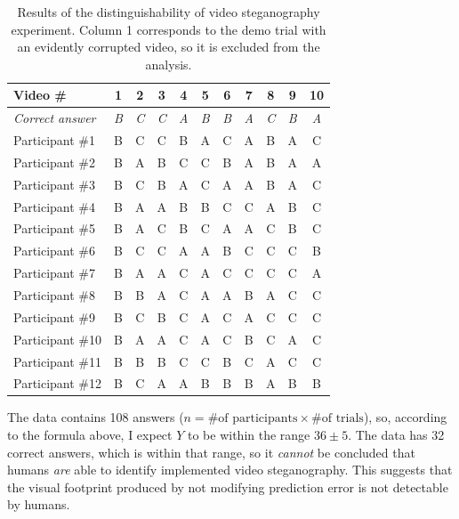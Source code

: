\documentclass[12pt,british,twoside,notitlepage,usenames,dvipsnames,hypens,final]{report}
\numberwithin{equation}{section}
\numberwithin{figure}{section}
\begin{document}
\begin{table}[tbh]
\centering
\bgroup
\def\arraystretch{1.3}
\begin{tabular}{|l|c|c|c|c|c|c|c|c|c|c|}
\hline
\textbf{Video \#} & \textbf{1} & \textbf{2} & \textbf{3} & \textbf{4} & \textbf{5} & \textbf{6} & \textbf{7} & \textbf{8} & \textbf{9} & \textbf{10}\\
\hline
\textit{Correct answer} & \textit{B} & \textit{C} & \textit{C} & \textit{A} & \textit{B} & \textit{B} & \textit{A} & \textit{C} & \textit{B} & \textit{A}\\
\hline
Participant \#1  & B & C & C & B & A & C & A & B & A & C \\
Participant \#2  & B & A & B & C & C & B & A & B & A & A \\
Participant \#3  & B & C & B & A & C & A & A & B & A & C \\
Participant \#4  & B & A & A & B & B & C & C & A & B & C \\
Participant \#5  & B & A & C & B & C & A & A & C & B & C \\
Participant \#6  & B & C & C & A & A & B & C & C & C & B \\
Participant \#7  & B & A & A & C & A & C & C & C & C & A \\
Participant \#8  & B & B & A & C & A & A & B & A & C & C \\
Participant \#9  & B & C & B & C & A & C & A & C & C & C \\
Participant \#10 & B & A & A & C & A & C & B & C & A & C \\
Participant \#11 & B & B & B & C & C & B & C & A & C & C \\
Participant \#12 & B & C & A & A & B & B & B & A & B & B \\
\hline
\end{tabular}
\egroup
\caption{Results of the distinguishability of video steganography experiment. Column 1 corresponds to the demo trial with an evidently corrupted video, so it is excluded from the analysis.}
\label{tbl:detect-exp-res}
\end{table}

The data contains 108 answers ($n = \text{\# of participants} \times \text{\# of trials}$), so, according to the formula above, I expect $Y$ to be within the range $36 \pm 5$. The data has 32 correct answers, which is within that range, so it \emph{cannot} be concluded that humans \emph{are} able to identify implemented video steganography. This suggests that the visual footprint produced by not modifying prediction error is not detectable by humans.
\end{document}
